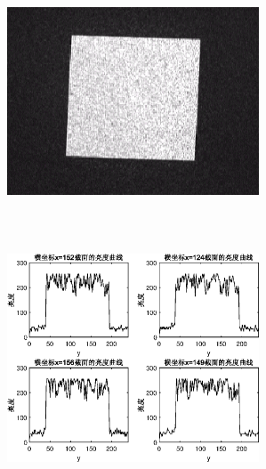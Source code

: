 \documentclass[UTF8]{ctexart}
\makeatletter
\newcommand{\figcaption}{\def\@captype{figure}\caption}
\makeatother
\begin{document}
\begin{center}
			\includegraphics[width=7.5cm,height=7.5cm]{YUANaddDOEangel1.eps}
			\includegraphics[width=7.5cm,height=7.5cm]{addDOEangel1.eps}
			\figcaption{加DOE的CCD捕捉图和光亮度曲线(角度1)}\label{addDOEangel1}
			

\end{center}
\end{document}
